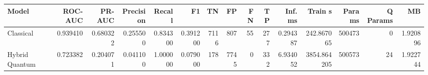\begin{table}[ht]
\centering
\begin{tabular}{lrrrrrrrrrrrrrr}
\toprule
Model & ROC-AUC & PR-AUC & Precision & Recall & F1 & TN & FP & FN & TP & Inf. ms & Train s & Params & Q Params & MB \\
\midrule
Classical & 0.939410 & 0.680322 & 0.255500 & 0.834300 & 0.391200 & 7116 & 807 & 55 & 277 & 0.294387 & 242.867065 & 500473 & 0 & 1.920896 \\
Hybrid Quantum & 0.723382 & 0.204071 & 0.041100 & 1.000000 & 0.079000 & 178 & 7745 & 0 & 332 & 6.934052 & 3854.864205 & 500573 & 24 & 1.922744 \\
\bottomrule
\end{tabular}
\end{table}
